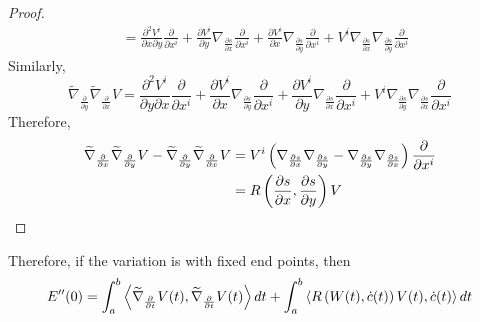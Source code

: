 \begin{enumerate}[label=\arabic{*}.]
\begin{proof}
\begin{equation*}
\begin{aligned}
				&= \frac{\partial^2 V^i}{\partial x\partial y}\frac{\partial}{\partial x^i} + \frac{\partial V^i}{\partial y}{\nabla}_{\frac{\partial s}{\partial x}}\frac{\partial}{\partial x^i} + \frac{\partial V^i}{\partial x}\nabla_{\frac{\partial s}{\partial y}} \frac{\partial}{\partial x^i}+ V^i\nabla_{\frac{\partial s}{\partial x}}\nabla_{\frac{\partial s}{\partial y}} \frac{\partial}{\partial x^i} 
			\end{aligned}
		\end{equation*}
		Similarly,
		\begin{equation*}
			\widetilde{\nabla}_{\frac{\partial}{\partial y}}\widetilde{\nabla}_{\frac{\partial}{\partial x}}V =\frac{\partial^2 V^i}{\partial y\partial x}\frac{\partial}{\partial x^i} + \frac{\partial V^i}{\partial x}{\nabla}_{\frac{\partial s}{\partial y}}\frac{\partial}{\partial x^i} + \frac{\partial V^i}{\partial y}\nabla_{\frac{\partial s}{\partial x}} \frac{\partial}{\partial x^i}+ V^i\nabla_{\frac{\partial s}{\partial y}}\nabla_{\frac{\partial s}{\partial x}} \frac{\partial}{\partial x^i} 
		\end{equation*}
		Therefore,
		\begin{equation*}
			\begin{aligned}
				\widetilde{\nabla}_{\frac{\partial}{\partial x}}\widetilde{\nabla}_{\frac{\partial}{\partial y}}V -\widetilde{\nabla}_{\frac{\partial}{\partial y}}\widetilde{\nabla}_{\frac{\partial}{\partial x}}V &= V^i\left(\nabla_{\frac{\partial s}{\partial x}}\nabla_{\frac{\partial s}{\partial y}}  - \nabla_{\frac{\partial s}{\partial y}}\nabla_{\frac{\partial s}{\partial x}}\right) \frac{\partial}{\partial x^i} \\
				&= R\left(\frac{\partial s}{\partial x},\frac{\partial s}{\partial y}\right)V
			\end{aligned}
		\end{equation*}
	\end{proof}
	Therefore, if the variation is with fixed end points, then
	\begin{equation*}
			E^{\prime\prime}(0) = \int_a^b\left\langle \widetilde{\nabla}_{\frac{\partial}{\partial t}}V(t), \widetilde{\nabla}_{\frac{\partial}{\partial t}}V(t) \right\rangle dt + \int_a^b\left\langle R\left(W(t),\dot{c}(t)\right)V(t), \dot{c}(t) \right\rangle dt
	\end{equation*}


\end{enumerate}
